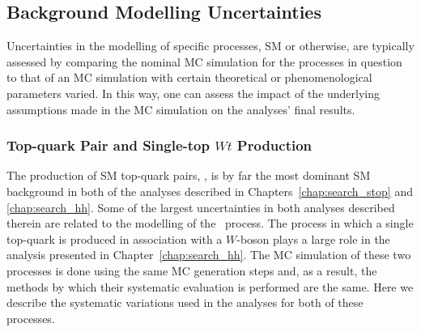 \subsection{Background Modelling Uncertainties}
\label{sec:syst_bkg_modelling}

Uncertainties in the modelling of specific processes, SM or otherwise, are typically
assessed by comparing the nominal MC simulation for the processes in question to
that of an MC simulation with certain theoretical or phenomenological parameters varied.
In this way, one can assess the impact of the underlying assumptions made
in the MC simulation on the analyses' final results.

\subsubsection{Top-quark Pair and Single-top $Wt$ Production}
The production of SM top-quark pairs, \ttbar, is by far the most dominant SM background
in both of the analyses described in Chapters~\ref{chap:search_stop} and \ref{chap:search_hh}.
Some of the largest uncertainties in both analyses described therein are related to the modelling
of the \ttbar~process.
The process in which a single top-quark is produced in association with a $W$-boson plays a large
role in the analysis presented in Chapter~\ref{chap:search_hh}.
The MC simulation of these two processes is done using the same MC generation steps and, as a result,
the methods by which their systematic evaluation is performed are the same.
Here we describe the systematic variations used in the analyses for both of these processes.

